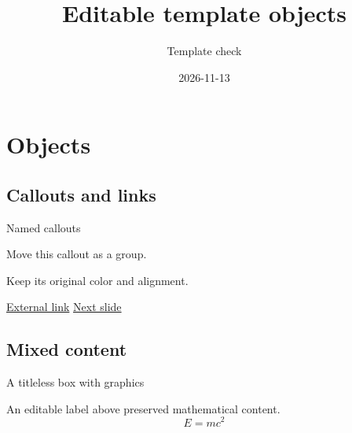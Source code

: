 \documentclass[theme=\objecttesttheme,aspectratio=\objecttestaspect,language=english,cjk=false]{campusbeamer}
\title{Editable template objects}
\author{Template check}
\date{2026-11-13}
\begin{document}
\maketitle
\section{Objects}
\subsection{Callouts and links}
\begin{frame}[t]{Named callouts}
  \begin{tipbox}Move this callout as a group.\end{tipbox}
  \begin{notebox}Keep its original color and alignment.\end{notebox}
  \begin{alertbox}
    \href{https://example.org/objects}{External link}\quad
    \hyperlink{objects-detail}{Next slide}
  \end{alertbox}
\end{frame}
\subsection{Mixed content}
\begin{frame}[label=objects-detail]{A titleless box with graphics}
  \begin{campusbox}[examplecolor]
    An editable label above preserved mathematical content.
    \[E=mc^2\]
  \end{campusbox}
\end{frame}
\end{document}
